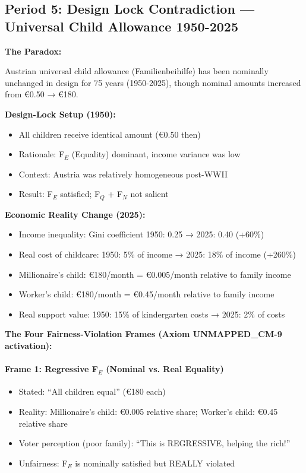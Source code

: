 \subsection{Period 5: Design Lock Contradiction --- Universal Child Allowance 1950-2025}

\textbf{The Paradox:}

Austrian universal child allowance (Familienbeihilfe) has been nominally unchanged in design
for 75 years (1950-2025), though nominal amounts increased from €0.50 → €180.

\textbf{Design-Lock Setup (1950):}
\begin{itemize}[nosep]
\item All children receive identical amount (€0.50 then)
\item Rationale: F$_E$ (Equality) dominant, income variance was low
\item Context: Austria was relatively homogeneous post-WWII
\item Result: F$_E$ satisfied; F$_Q$ + F$_N$ not salient
\end{itemize}

\textbf{Economic Reality Change (2025):}
\begin{itemize}[nosep]
\item Income inequality: Gini coefficient 1950: 0.25 → 2025: 0.40 (+60\%)
\item Real cost of childcare: 1950: 5\% of income → 2025: 18\% of income (+260\%)
\item Millionaire's child: €180/month = €0.005/month relative to family income
\item Worker's child: €180/month = €0.45/month relative to family income
\item Real support value: 1950: 15\% of kindergarten costs → 2025: 2\% of costs
\end{itemize}

\textbf{The Four Fairness-Violation Frames (Axiom UNMAPPED_CM-9 activation):}

\paragraph{Frame 1: Regressive F$_E$ (Nominal vs. Real Equality)}
\begin{itemize}[nosep]
\item Stated: ``All children equal'' (€180 each)
\item Reality: Millionaire's child: €0.005 relative share; Worker's child: €0.45 relative share
\item Voter perception (poor family): ``This is REGRESSIVE, helping the rich!''
\item Unfairness: F$_E$ is nominally satisfied but REALLY violated
\end{itemize}

